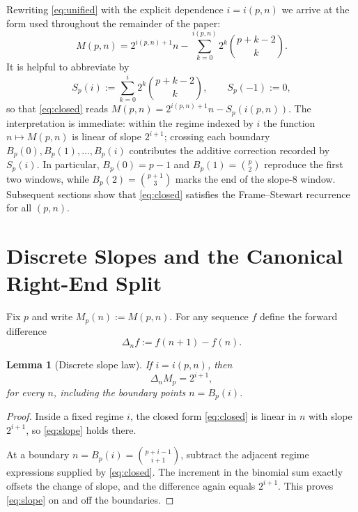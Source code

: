 \documentclass[11pt]{article}
\newtheorem{lemma}[theorem]{Lemma}
\theoremstyle{definition}
\begin{document}
Rewriting \eqref{eq:unified} with the explicit dependence $i = i(p,n)$ we arrive at the form used throughout the remainder of the paper:
\begin{equation}\label{eq:closed}
M(p,n) = 2^{i(p,n)+1}n - \sum_{k=0}^{i(p,n)} 2^k \binom{p+k-2}{k}.
\end{equation}
It is helpful to abbreviate by
\begin{equation}\label{eq:Sp}
S_p(i) := \sum_{k=0}^{i} 2^k \binom{p+k-2}{k}, \qquad S_p(-1) := 0,
\end{equation}
so that \eqref{eq:closed} reads $M(p,n) = 2^{i(p,n)+1}n - S_p(i(p,n))$. The interpretation is immediate: within the regime indexed by $i$ the function $n \mapsto M(p,n)$ is linear of slope $2^{i+1}$; crossing each boundary $B_p(0), B_p(1), \dots, B_p(i)$ contributes the additive correction recorded by $S_p(i)$. In particular, $B_p(0) = p-1$ and $B_p(1) = \binom{p}{2}$ reproduce the first two windows, while $B_p(2) = \binom{p+1}{3}$ marks the end of the slope-8 window. Subsequent sections show that \eqref{eq:closed} satisfies the Frame--Stewart recurrence for all $(p,n)$.

\section{Discrete Slopes and the Canonical Right-End Split}

Fix $p$ and write $M_p(n) := M(p,n)$. For any sequence $f$ define the forward difference
\begin{equation}\label{eq:delta}
\Delta_n f := f(n+1) - f(n).
\end{equation}

\begin{lemma}[Discrete slope law]\label{lem:slope}
If $i = i(p,n)$, then
\begin{equation}\label{eq:slope}
\Delta_n M_p = 2^{i+1},
\end{equation}
for every $n$, including the boundary points $n = B_p(i)$.
\end{lemma}

\begin{proof}
Inside a fixed regime $i$, the closed form \eqref{eq:closed} is linear in $n$ with slope $2^{i+1}$, so \eqref{eq:slope} holds there.

At a boundary $n = B_p(i) = \binom{p+i-1}{i+1}$, subtract the adjacent regime expressions supplied by \eqref{eq:closed}. The increment in the binomial sum exactly offsets the change of slope, and the difference again equals $2^{i+1}$. This proves \eqref{eq:slope} on and off the boundaries.
\end{proof}
\end{document}
